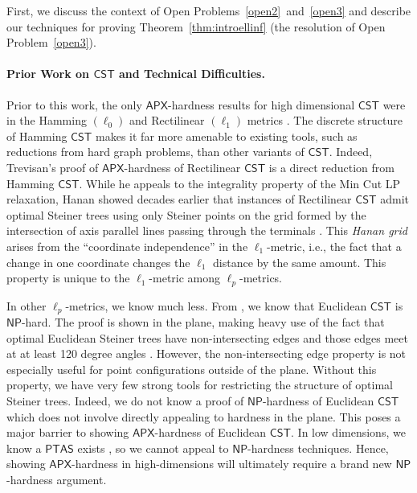 \documentclass{theoretics}
\newcommand{\1}{\textbf{1}}
\newcommand{\cst}{$\mathsf{CST}$\xspace}
\newcommand{\np}{$\mathsf{NP}$\xspace}
\newcommand{\apx}{$\mathsf{APX}$\xspace}
\newcommand{\ptas}{$\mathsf{PTAS}$\xspace}
\begin{document}
First, we discuss the context of Open Problems~\ref{open2}~and~\ref{open3} and describe our techniques for proving Theorem~\ref{thm:introellinf} (the resolution of Open Problem~\ref{open3}). 

\paragraph{\texorpdfstring{Prior Work on \cst and Technical Difficulties.}{Prior Work on CST and Technical Difficulties.}}
Prior to this work, the only \apx-hardness results for high dimensional \cst were in the Hamming $(\ell_0)$ and Rectilinear $(\ell_1)$ metrics \cite{Wareham_1995, Trevisan00}. The discrete structure of Hamming \cst makes it far more amenable to existing tools, such as reductions from hard graph problems, than other variants of \cst. Indeed, Trevisan's proof of \apx-hardness of Rectilinear \cst is a direct reduction from Hamming \cst. While he appeals to the integrality property of the Min Cut LP relaxation, Hanan showed decades earlier that instances of Rectilinear \cst admit optimal Steiner trees using only Steiner points on the grid formed by the intersection of axis parallel lines passing through the terminals \cite{Hanan_1966}. This \textit{Hanan grid} arises from the ``coordinate independence'' in the $\ell_1$-metric, i.e., the fact that a change in one coordinate changes the $\ell_1$ distance by the same amount. This property is unique to the $\ell_1$-metric among $\ell_p$-metrics.

In other $\ell_p$-metrics, we know much less. From \cite{Garey_Graham_Johnson_1977}, we know that Euclidean \cst is \np-hard. The proof is shown in the plane, making heavy use of the fact that optimal Euclidean Steiner trees have non-intersecting edges and those edges meet at at least 120 degree angles \cite{Gilbert_Pollak_1968}. However, the non-intersecting edge property is not especially useful for point configurations outside of the plane. Without this property, we have very few strong tools for restricting the structure of optimal Steiner trees. Indeed, we do not know a proof of \np-hardness of Euclidean \cst which does not involve directly appealing to hardness in the plane. This poses a major barrier to showing \apx-hardness of Euclidean \cst. In low dimensions, we know a \ptas exists \cite{Arora_1998}, so we cannot appeal to \np-hardness techniques. Hence, showing \apx-hardness in high-dimensions will ultimately require a brand new \np-hardness argument.
\end{document}
